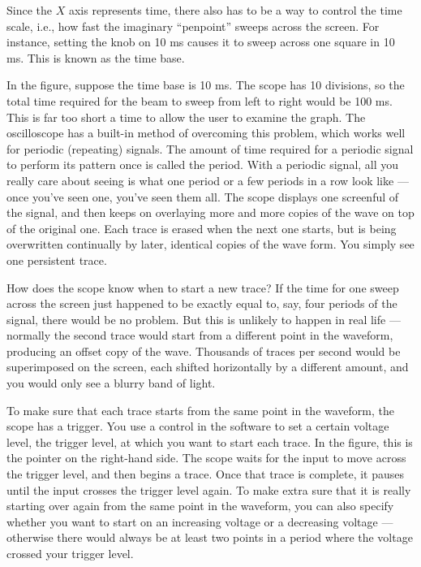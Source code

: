 Since the $X$ axis represents time, there also has to be a way
to control the time scale, i.e., how fast the imaginary
``penpoint'' sweeps across the screen. For instance, setting
the knob on 10 ms causes it to sweep across one square
in 10 ms. This is known as the time base.

In the figure, suppose the time base is 10 ms.
The scope has 10
divisions, so the total time required for the beam to sweep
from left to right would be 100 ms. This is far too short a
time to allow the user to examine the graph.
The oscilloscope has a built-in method of overcoming this
problem, which works well for periodic (repeating)
signals. The amount of
time required for a periodic signal to perform its pattern
once is called the period. With a periodic signal, all you
really care about seeing is what one period or a few periods in
a row look like --- once you've seen one, you've seen them
all. The scope displays one screenful of the
signal, and then keeps on overlaying more and more copies of
the wave on top of the original one. Each
trace is erased when the next one starts, but is being overwritten
continually by later, identical copies of the wave form. You
simply see one persistent trace.

How does the scope know when to start a new trace? If the
time for one sweep across the screen just happened to be
exactly equal to, say, four periods of the signal, there
would be no problem. But this is unlikely to happen in real
life --- normally the second trace would start from a
different point in the waveform, producing an offset copy of
the wave. Thousands of traces per second would be superimposed
on the screen, each shifted horizontally by a different
amount, and you would only see a blurry band of light.

To make sure that each trace starts from the same point in
the waveform, the scope has a trigger. You use a
control in the software to set a certain voltage level, the trigger level, at
which you want to start each trace. In the figure, this is the pointer
on the right-hand side. The scope waits for the
input to move across the trigger level, and then begins a
trace. Once that trace is complete, it pauses until the
input crosses the trigger level again. To make extra sure
that it is really starting over again from the same point in
the waveform, you can also specify whether you want to start
on an increasing voltage or a decreasing voltage ---
otherwise there would always be at least two points in a
period where the voltage crossed your trigger level.

